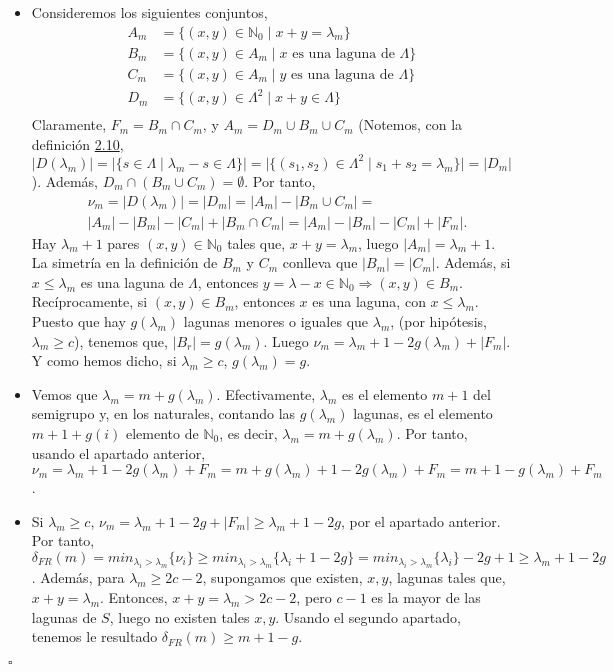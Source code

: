 \documentclass[11pt,spanish]{book}
\newcommand{\qed}{\begin{flushright} $\square$ \end{flushright}}
\newcommand{\la}{\lambda}
\begin{document}
\begin{itemize}
    \item Consideremos los siguientes conjuntos, 
    \begin{align*}
        A_m &= \{(x,y)\in\mathbb{N}_0\;|\; x+y=\lambda_m\}\\
        B_m   &= \{(x,y)\in A_m\;|\; x\text{ es una laguna de }\Lambda\}\\
        C_m   &= \{(x,y)\in A_m\;|\; y\text{ es una laguna de }\Lambda\}\\
        D_m   &= \{(x,y)\in \Lambda^2\;|\; x+y\in\Lambda\}\\
    \end{align*}
    Claramente, $F_m = B_m\cap C_m$, y $A_m = D_m\cup B_m \cup C_m$ (Notemos, con la definición \hyperlink{def2.10}{2.10}, $|D(\lambda_m)|=|\{s\in \Lambda\;|\; \lambda_m-s\in \Lambda\}|=|\{(s_1,s_2)\in \Lambda^2\;|\; s_1+s_2 =\lambda_m\}|=|D_m|$). Además, $D_m\cap (B_m\cup C_m) = \emptyset$. Por tanto,
    \begin{align*}
    &\nu_m=|D(\lambda_m)|=|D_m|=|A_m|-|B_m\cup C_m|=\\
    &|A_m|-|B_m|-|C_m|+|B_m\cap C_m|=|A_m|-|B_m|-|C_m|+|F_m|.
    \end{align*}
    Hay $\lambda_m+1$ pares $(x,y)\in\mathbb{N}_0$ tales que, $x+y=\lambda_m$, luego $|A_m|=\lambda_m+1$. La simetría en la definición de $B_m$ y $C_m$ conlleva que $|B_m|=|C_m|$. Además, si $x\leq \lambda_m$ es una laguna de $\Lambda$, entonces $y=\lambda-x\in\mathbb{N}_0\Rightarrow (x,y)\in B_m$. Recíprocamente, si $(x,y)\in B_m$, entonces $x$ es una laguna, con $x\leq \lambda_m$. Puesto que hay $g(\lambda_m)$ lagunas menores o iguales que $\lambda_m$, (por hipótesis, $\lambda_m\geq c$), tenemos que, $|B_r|=g(\lambda_m)$. Luego $\nu_m = \lambda_m+1-2g(\lambda_m)+|F_m|$. Y como hemos dicho, si $\lambda_m\geq c$, $g(\lambda_m)=g$.
    \item Vemos que $\la_m=m+g(\la_m)$. Efectivamente, $\la_m$ es el elemento $m+1$ del semigrupo y, en los naturales, contando las $g(\la_m)$ lagunas, es el elemento $m+1+g(i)$ elemento de $\mathbb{N}_0$, es decir,  $\la_m=m+g(\la_m)$. Por tanto, usando el apartado anterior, $\nu_m = \lambda_m+1-2g(\lambda_m)+F_m = m+g(\la_m)  +1-2g(\la_m)+F_m=m+1-g(\la_m)+F_m$.
    \item Si $\lambda_m\geq c$, $\nu_m=\lambda_m+1-2g+|F_m|\geq \lambda_m+1-2g$, por el apartado anterior. Por tanto, $\delta_{FR}(m)=min_{\la_i>\la_m}\{\nu_i\}\geq min_{\la_i>\la_m}\{\lambda_i+1-2g\}=min_{\la_i>\la_m}\{\la_i\}-2g+1\geq \lambda_m+1-2g$. Además, para $\lambda_m \geq 2c-2$, supongamos que existen, $x,y$, lagunas tales que, $x+y=\la_m$. Entonces, $x+y=\la_m>2c-2$, pero $c-1$ es la mayor de las lagunas de $S$, luego no existen tales $x,y$. Usando el segundo apartado, tenemos le resultado $\delta_{FR}(m)\geq m +1-g$.
\end{itemize}
\qed
\end{document}
